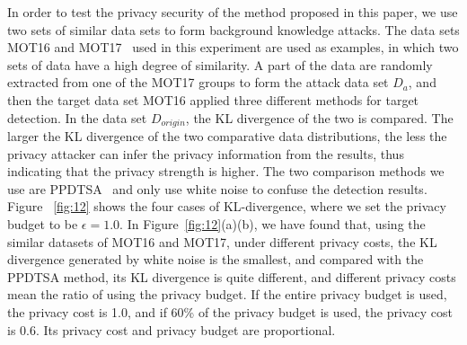 \documentclass[trans]{IEEEtran}
\newcommand{\el}[1]{{\color{black}#1}}
\begin{document}


In order to test the privacy security of the method proposed in this paper, we use two sets of similar data sets to form background knowledge attacks. The data sets MOT16 and MOT17~\cite{milan2016mot16} used in this experiment are used as examples, in which two sets of data \el{have a high degree of similarity. A part of the data are randomly extracted from one of the MOT17 groups to form the attack data set $D_a$, and then the target data set MOT16 applied three different methods for target detection. In the data set $D_{ origin}$, the KL divergence of the two is compared. The larger the KL divergence of the two comparative data distributions, the less the privacy attacker can infer the privacy information from the results, thus indicating that the privacy strength is higher. The two comparison methods we use are PPDTSA~\cite{ma2021ppdtsa} and only use white noise to confuse the detection results. Figure ~\ref{fig:12} shows the four cases of KL-divergence, where we set the privacy budget to be $\epsilon = 1.0$. In Figure~\ref{fig:12}(a)(b), we have found that, using the similar datasets of MOT16 and MOT17, under different privacy costs, the KL divergence generated by white noise is the smallest, and compared with the PPDTSA method, its KL divergence is quite different,} and different privacy costs mean the ratio of using the privacy budget. If the entire privacy budget is used, the privacy cost is 1.0, and if 60\% of the privacy budget is used, the privacy cost is 0.6. Its privacy cost and privacy budget are proportional.
\end{document}

